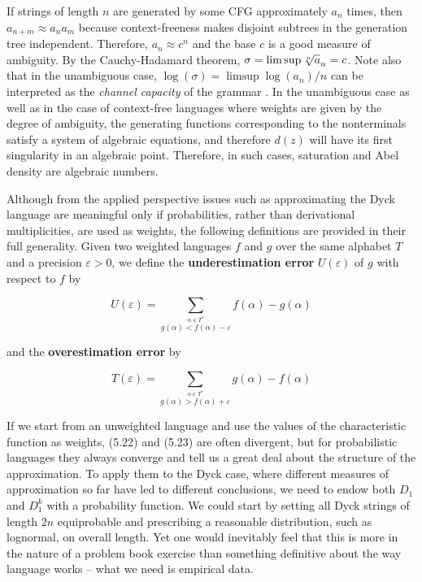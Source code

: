 If strings of length $n$ are generated by some CFG approximately $a_n$ times,
then $a_{n+m}\approx a_na_m$ because context-freeness makes disjoint subtrees
in the generation tree independent.  Therefore, $a_n \approx c^n$ and the base
$c$ is a good measure of ambiguity. By the Cauchy-Hadamard theorem,
$\sigma=\limsup \root n \of a_n = c$. Note also that in the unambiguous case,
$\log(\sigma) = \limsup \log(a_n)/n$ can be interpreted as the {\it channel
capacity} of the grammar \cite{Kuich:1970}.  In the unambiguous case as well
as in the case of context-free languages where weights are given by the degree
of ambiguity, the generating functions corresponding to the nonterminals
satisfy a system of algebraic equations, and therefore $d(z)$ will have its
first singularity in an algebraic point. Therefore, in such cases, saturation
and Abel density are algebraic numbers. 

Although from the applied perspective issues such as approximating the Dyck
language are meaningful only if probabilities, rather than derivational
multiplicities, are used as weights, the following definitions are provided in
their full generality. Given two weighted languages $f$ and $g$ over the same
alphabet $T$ and a precision $\varepsilon > 0$, we define the {\bf
underestimation error} 
$U(\varepsilon)$ of $g$ with respect to $f$ by

\begin{equation} 
U(\varepsilon)=\sum_{\stackrel{\alpha \in T^*}{g(\alpha) < f(\alpha) -
    \varepsilon}} f(\alpha) -g(\alpha)
\end{equation} 

\noindent
and the {\bf overestimation error} by 

\begin{equation} 
T(\varepsilon) = \sum_{\stackrel{\alpha \in T^*}{g(\alpha) > f(\alpha) +
    \varepsilon}} g(\alpha) -f( \alpha)
\end{equation}

\smallskip 
\noindent 

If we start from an unweighted language and use the values of the
characteristic function as weights, (5.22) and (5.23) are often divergent, but
for probabilistic languages they always converge and tell us a great deal
about the structure of the approximation. To apply them to the Dyck case,
where different measures of approximation so far have led to different
conclusions, we need to endow both $D_1$ and $D_1^k$ with a probability
function. We could start by setting all Dyck strings of length $2n$
equiprobable and prescribing a reasonable distribution, such as lognormal, on
overall length. Yet one would inevitably feel that this is more in the nature
of a problem book exercise than something definitive about the way language
works -- what we need is empirical data.

